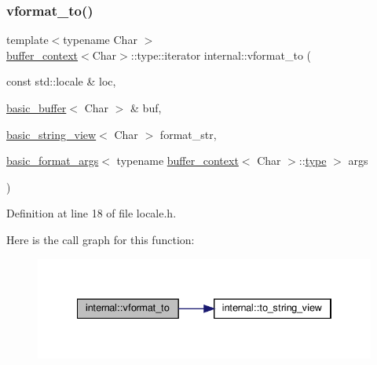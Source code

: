 \subsubsection{\texorpdfstring{vformat\+\_\+to()}{vformat\_to()}\hspace{0.1cm}{\footnotesize\ttfamily [1/2]}}
{\footnotesize\ttfamily template$<$typename Char $>$ \\
\hyperlink{structbuffer__context}{buffer\+\_\+context}$<$Char$>$\+::type\+::iterator internal\+::vformat\+\_\+to (\begin{DoxyParamCaption}\item[{const std\+::locale \&}]{loc,  }\item[{\hyperlink{classinternal_1_1basic__buffer}{basic\+\_\+buffer}$<$ Char $>$ \&}]{buf,  }\item[{\hyperlink{classbasic__string__view}{basic\+\_\+string\+\_\+view}$<$ Char $>$}]{format\+\_\+str,  }\item[{\hyperlink{classbasic__format__args}{basic\+\_\+format\+\_\+args}$<$ typename \hyperlink{structbuffer__context}{buffer\+\_\+context}$<$ Char $>$\+::\hyperlink{namespaceinternal_a8661864098ac0acff9a6dd7e66f59038}{type} $>$}]{args }\end{DoxyParamCaption})}



Definition at line 18 of file locale.\+h.

Here is the call graph for this function\+:
\nopagebreak
\begin{figure}[H]
\begin{center}
\leavevmode
\includegraphics[width=334pt]{namespaceinternal_acc6b15a4992910ac85ba84aa7dfede48_cgraph}
\end{center}
\end{figure}
\mbox{\label{namespaceinternal_a9f6f592ec8a979251038265f241e7d48}} 
